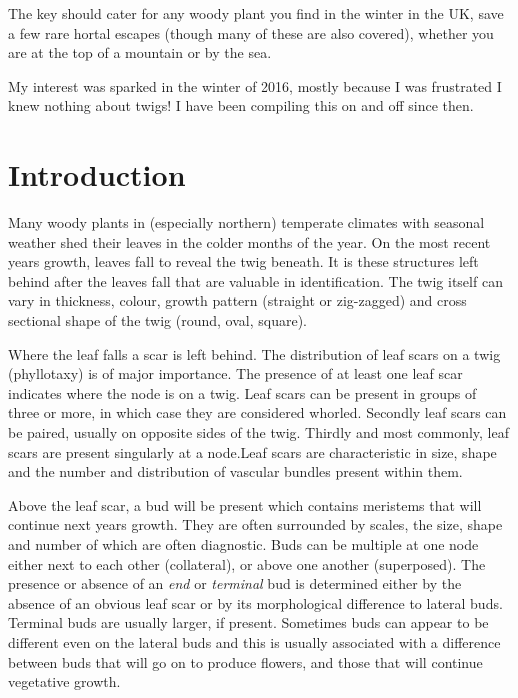 \documentclass[openany]{book}
\begin{document}
The key should cater for any woody plant you find in the winter in the
UK, save a few rare hortal escapes (though many of these are also
covered), whether you are at the top of a mountain or by the sea.

My interest was sparked in the winter of 2016, mostly because I was
frustrated I knew nothing about twigs! I have been compiling this on and
off since then.

\hypertarget{introduction}{%
\chapter*{Introduction}\label{introduction}}

Many woody plants in (especially northern) temperate climates with
seasonal weather shed their leaves in the colder months of the year. On
the most recent years growth, leaves fall to reveal the twig beneath. It
is these structures left behind after the leaves fall that are valuable
in identification. The twig itself can vary in thickness, colour, growth
pattern (straight or zig-zagged) and cross sectional shape of the twig
(round, oval, square).

Where the leaf falls a scar is left behind. The distribution of leaf
scars on a twig (phyllotaxy) is of major importance. The presence of at
least one leaf scar indicates where the node is on a twig. Leaf scars
can be present in groups of three or more, in which case they are
considered whorled. Secondly leaf scars can be paired, usually on
opposite sides of the twig. Thirdly and most commonly, leaf scars are
present singularly at a node.Leaf scars are characteristic in size,
shape and the number and distribution of vascular bundles present within
them.

Above the leaf scar, a bud will be present which contains meristems that
will continue next years growth. They are often surrounded by scales,
the size, shape and number of which are often diagnostic. Buds can be
multiple at one node either next to each other (collateral), or above
one another (superposed). The presence or absence of an \emph{end} or
\emph{terminal} bud is determined either by the absence of an obvious
leaf scar or by its morphological difference to lateral buds. Terminal
buds are usually larger, if present. Sometimes buds can appear to be
different even on the lateral buds and this is usually associated with a
difference between buds that will go on to produce flowers, and those
that will continue vegetative growth.
\end{document}
